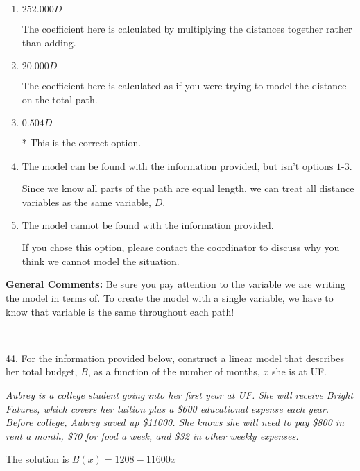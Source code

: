 \documentclass{article}[14pt]
\begin{document}
\begin{enumerate}[label=\Alph*.] 
\item $ 252.000 D $ 

 The coefficient here is calculated by multiplying the distances together rather than adding. 
\item $ 20.000 D $ 

 The coefficient here is calculated as if you were trying to model the distance on the total path. 
\item $ 0.504 D $ 

 * This is the correct option. 
\item $ \text{The model can be found with the information provided, but isn't options 1-3.} $ 

 Since we know all parts of the path are equal length, we can treat all distance variables as the same variable, $D$. 
\item $ \text{The model cannot be found with the information provided.} $ 

 If you chose this option, please contact the coordinator to discuss why you think we cannot model the situation. 
\end{enumerate} 
 
\textbf{General Comments:} Be sure you pay attention to the variable we are writing the model in terms of. To create the model with a single variable, we have to know that variable is the same throughout each path!

-----------------------------------------------

44. For the information provided below, construct a linear model that describes her total budget, $B$, as a function of the number of months, $x$ she is at UF.
\begin{center} \textit{Aubrey is a college student going into her first year at UF. She will receive Bright Futures, which covers her tuition plus a \$600 educational expense each year. Before college, Aubrey saved up \$11000. She knows she will need to pay \$800 in rent a month, \$70 for food a week, and \$32 in other weekly expenses.} \end{center} 
The solution is $ B(x) = 1208 - 11600 x $ 
\end{document}
